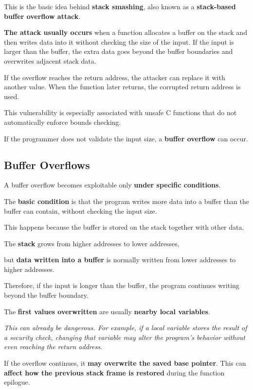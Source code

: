 \documentclass{article}
\begin{document}
This is the basic idea behind \textbf{stack smashing}, also known as a \textbf{stack-based buffer overflow attack}.

\textbf{The attack usually occurs} when a function allocates a buffer on the stack and then writes data into it without checking the size of the input. If the input is larger than the buffer, the extra data goes beyond the buffer boundaries and overwrites adjacent stack data.

If the overflow reaches the return address, the attacker can replace it with another value. When the function later returns, the corrupted return address is used.

This vulnerability is especially associated with unsafe C functions that do not automatically enforce bounds checking.

If the programmer does not validate the input size, a \textbf{buffer overflow} can occur.

\subsection{Buffer Overflows}

A buffer overflow becomes exploitable only \textbf{under specific conditions}.

The \textbf{basic condition} is that the program writes more data into a buffer than the buffer can contain, without checking the input size.

This happens because the buffer is stored on the stack together with other data.

The \textbf{stack} grows from higher addresses to lower addresses,

but \textbf{data written into a buffer} is normally written from lower addresses to higher addresses.

Therefore, if the input is longer than the buffer, the program continues writing beyond the buffer boundary.

The \textbf{first values overwritten} are usually \textbf{nearby local variables}.

\textit{This can already be dangerous. For example, if a local variable stores the result of a security check, changing that variable may alter the program's behavior without even reaching the return address.}

If the overflow continues, it \textbf{may overwrite the saved base pointer}. This can \textbf{affect how the previous stack frame is restored} during the function epilogue.
\end{document}
